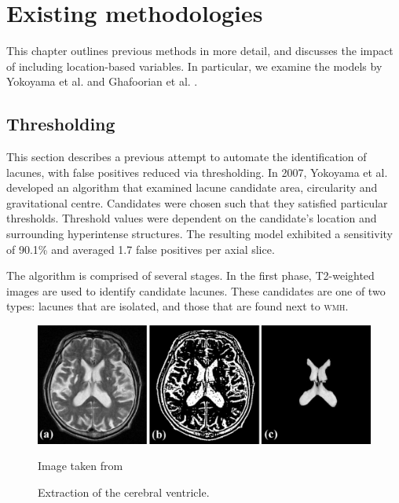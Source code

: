 


\chapter{Existing methodologies}\label{litrev}

This chapter outlines previous methods in more detail, and discusses the impact of including location-based variables. In particular, we examine the models by Yokoyama et al. \cite{Yokoyama2007} and Ghafoorian et al. \cite{GhafoorianM.2017Dml3}.

\section{Thresholding}\label{litrev-threshold}

This section describes a previous attempt to automate the identification of lacunes, with false positives reduced via thresholding. In 2007, Yokoyama et al. \cite{Yokoyama2007} developed an algorithm that examined lacune candidate area, circularity and gravitational centre. Candidates were chosen such that they satisfied particular thresholds. Threshold values were dependent on the candidate's location and surrounding hyperintense structures. The resulting model exhibited a sensitivity of 90.1\% and averaged 1.7 false positives per axial slice.


The algorithm is comprised of several stages. In the first phase, T2-weighted images are used to identify candidate lacunes. These candidates are one of two types: lacunes that are isolated, and those that are found next to \textsc{wmh}.

\begin{figure}[ht]
	\centering
	\includegraphics[width=\textwidth]{Images/5_extract_ventricle.png}
	\caption{Extraction of the cerebral ventricle.}
	\small Image taken from \cite{Yokoyama2007}
\end{figure}

